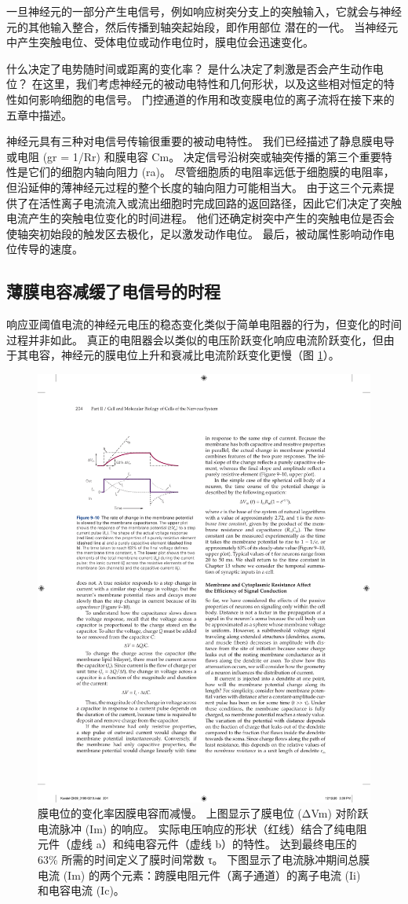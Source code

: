 一旦神经元的一部分产生电信号，例如响应树突分支上的突触输入，它就会与神经元的其他输入整合，然后传播到轴突起始段，即作用部位 潜在的一代。
当神经元中产生突触电位、受体电位或动作电位时，膜电位会迅速变化。


什么决定了电势随时间或距离的变化率？
是什么决定了刺激是否会产生动作电位？
在这里，我们考虑神经元的被动电特性和几何形状，以及这些相对恒定的特性如何影响细胞的电信号。 
门控通道的作用和改变膜电位的离子流将在接下来的五章中描述。


神经元具有三种对电信号传输很重要的被动电特性。 
我们已经描述了静息膜电导或电阻 (gr = 1/Rr) 和膜电容 Cm。 
决定信号沿树突或轴突传播的第三个重要特性是它们的细胞内轴向阻力 (ra)。 
尽管细胞质的电阻率远低于细胞膜的电阻率，但沿延伸的薄神经元过程的整个长度的轴向阻力可能相当大。 
由于这三个元素提供了在活性离子电流流入或流出细胞时完成回路的返回路径，因此它们决定了突触电流产生的突触电位变化的时间进程。 
他们还确定树突中产生的突触电位是否会使轴突初始段的触发区去极化，足以激发动作电位。 
最后，被动属性影响动作电位传导的速度。


\subsection{薄膜电容减缓了电信号的时程}
响应亚阈值电流的神经元电压的稳态变化类似于简单电阻器的行为，但变化的时间过程并非如此。 
真正的电阻器会以类似的电压阶跃变化响应电流阶跃变化，但由于其电容，神经元的膜电位上升和衰减比电流阶跃变化更慢（图 \ref{fig:9_10}）。

\begin{figure}[htbp]
	\centering
	\includegraphics[width=0.5\linewidth]{chap09/fig_9_10}
	\caption{膜电位的变化率因膜电容而减慢。 上图显示了膜电位 (ΔVm) 对阶跃电流脉冲 (Im) 的响应。 实际电压响应的形状（红线）结合了纯电阻元件（虚线 a）和纯电容元件（虚线 b）的特性。 达到最终电压的 63\% 所需的时间定义了膜时间常数 τ。 下图显示了电流脉冲期间总膜电流 (Im) 的两个元素：跨膜电阻元件（离子通道）的离子电流 (Ii) 和电容电流 (Ic)。}
	\label{fig:9_10}
\end{figure}


